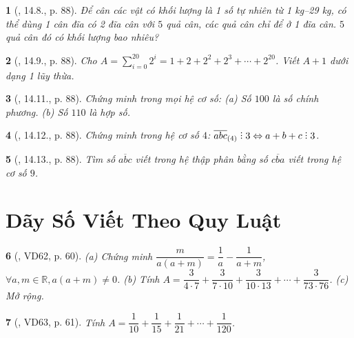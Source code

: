 \documentclass{article}
\newtheorem{baitoan}{}
\DeclareRobustCommand{\divby}{%
	\mathrel{\vbox{\baselineskip.65ex\lineskiplimit0pt\hbox{.}\hbox{.}\hbox{.}}}%
}
\begin{document}
\begin{baitoan}[\cite{TLCT_THCS_Toan_6_so_hoc}, 14.8., p. 88]
	Để cân các vật có khối lượng là 1 số tự nhiên từ {\rm1 kg--29 kg}, có thể dùng 1 cân đĩa có 2 đĩa cân với $5$ quả cân, các quả cân chỉ để ở 1 đĩa cân. $5$ quả cân đó có khối lượng bao nhiêu?
\end{baitoan}

\begin{baitoan}[\cite{TLCT_THCS_Toan_6_so_hoc}, 14.9., p. 88]
	Cho $A = \sum_{i=0}^{20} 2^i = 1 + 2 + 2^2 + 2^3 + \cdots + 2^{20}$. Viết $A + 1$ dưới dạng 1 lũy thừa.
\end{baitoan}

\begin{baitoan}[\cite{TLCT_THCS_Toan_6_so_hoc}, 14.11., p. 88]
	Chứng minh trong mọi hệ cơ số: (a) Số $100$ là số chính phương. (b) Số $110$ là hợp số.
\end{baitoan}

\begin{baitoan}[\cite{TLCT_THCS_Toan_6_so_hoc}, 14.12., p. 88]
	Chứng minh trong hệ cơ số $4$: $\overline{abc}_{(4)}\divby3\Leftrightarrow a + b + c\divby3$.
\end{baitoan}

\begin{baitoan}[\cite{TLCT_THCS_Toan_6_so_hoc}, 14.13., p. 88]
	Tìm số $\overline{abc}$ viết trong hệ thập phân bằng số $\overline{cba}$ viết trong hệ cơ số $9$.
\end{baitoan}


\section{Dãy Số Viết Theo Quy Luật}

\begin{baitoan}[\cite{Tuyen_Toan_6}, VD62, p. 60]
	(a) Chứng minh $\dfrac{m}{a(a + m)} = \dfrac{1}{a} - \dfrac{1}{a + m}$, $\forall a,m\in\mathbb{R},a(a + m)\ne0$. (b) Tính $A = \dfrac{3}{4\cdot7} + \dfrac{3}{7\cdot10} + \dfrac{3}{10\cdot13} + \cdots + \dfrac{3}{73\cdot76}$. (c) Mở rộng.
\end{baitoan}

\begin{baitoan}[\cite{Tuyen_Toan_6}, VD63, p. 61]
	Tính $A = \dfrac{1}{10} + \dfrac{1}{15} + \dfrac{1}{21} + \cdots + \dfrac{1}{120}$.
\end{baitoan}
\end{document}
